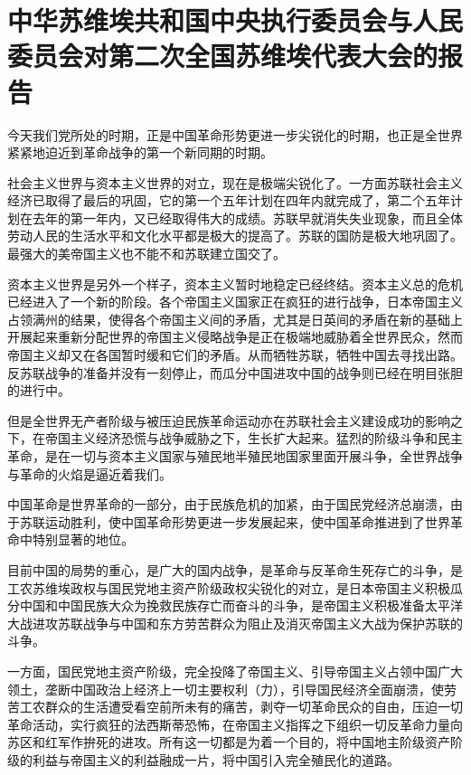 \section[中华苏维埃共和国中央执行委员会与人民委员会对第二次全国苏维埃代表大会的报告（一九三四年一月二十三日）]{中华苏维埃共和国中央执行委员会与人民委员会对第二次全国苏维埃代表大会的报告}


今天我们党所处的时期，正是中国革命形势更进一步尖锐化的时期，也正是全世界紧紧地迫近到革命战争的第一个新同期的时期。

社会主义世界与资本主义世界的对立，现在是极端尖锐化了。一方面苏联社会主义经济已取得了最后的巩固，它的第一个五年计划在四年内就完成了，第二个五年计划在去年的第一年内，又已经取得伟大的成绩。苏联早就消失失业现象，而且全体劳动人民的生活水平和文化水平都是极大的提高了。苏联的国防是极大地巩固了。最强大的美帝国主义也不能不和苏联建立国交了。

资本主义世界是另外一个样子，资本主义暂时地稳定已经终结。资本主义总的危机已经进入了一个新的阶段。各个帝国主义国家正在疯狂的进行战争，日本帝国主义占领满州的结果，使得各个帝国主义间的矛盾，尤其是日英间的矛盾在新的基础上开展起来重新分配世界的帝国主义侵略战争是正在极端地威胁着全世界民众，然而帝国主义却又在各国暂时缓和它们的矛盾。从而牺牲苏联，牺牲中国去寻找出路。反苏联战争的准备并没有一刻停止，而瓜分中国进攻中国的战争则已经在明目张胆的进行中。

但是全世界无产者阶级与被压迫民族革命运动亦在苏联社会主义建设成功的影响之下，在帝国主义经济恐慌与战争威胁之下，生长扩大起来。猛烈的阶级斗争和民主革命，是在一切与资本主义国家与殖民地半殖民地国家里面开展斗争，全世界战争与革命的火焰是逼近着我们。

中国革命是世界革命的一部分，由于民族危机的加紧，由于国民党经济总崩溃，由于苏联运动胜利，使中国革命形势更进一步发展起来，使中国革命推进到了世界革命中特别显著的地位。

目前中国的局势的重心，是广大的国内战争，是革命与反革命生死存亡的斗争，是工农苏维埃政权与国民党地主资产阶级政权尖锐化的对立，是日本帝国主义积极瓜分中国和中国民族大众为挽救民族存亡而奋斗的斗争，是帝国主义积极准备太平洋大战进攻苏联战争与中国和东方劳苦群众为阻止及消灭帝国主义大战为保护苏联的斗争。

一方面，国民党地主资产阶级，完全投降了帝国主义、引导帝国主义占领中国广大领土，垄断中国政治上经济上一切主要权利（力），引导国民经济全面崩溃，使劳苦工农群众的生活遭受看空前所未有的痛苦，剥夺一切革命民众的自由，压迫一切革命活动，实行疯狂的法西斯蒂恐怖，在帝国主义指挥之下组织一切反革命力量向苏区和红军作拚死的进攻。所有这一切都是为着一个目的，将中国地主阶级资产阶级的利益与帝国主义的利益融成一片，将中国引入完全殖民化的道路。

